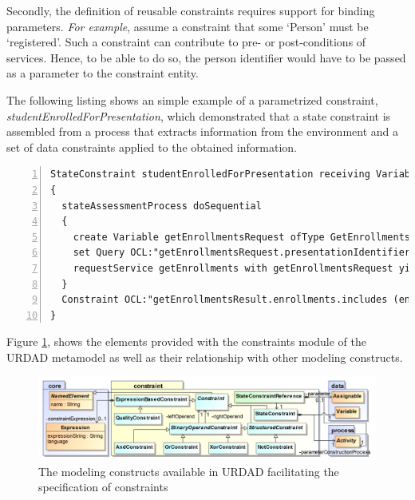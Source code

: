 Secondly, the definition of reusable constraints requires support for binding parameters. \emph{For example}, assume a constraint that some `Person' must be `registered'. Such a constraint can contribute to pre- or post-conditions of services. Hence, to be able to do so, the person identifier would have to be passed as a parameter to the constraint entity. 

The following listing shows an simple example of a parametrized constraint, \emph{studentEnrolledForPresentation}, which demonstrated that a state constraint is assembled from a process that extracts information from the environment and a set of data constraints applied to the obtained information.
\lstset{language=urdad,caption=Specifying a state constraint in the URDAD text grammar.,label=constraintTextSyntax}
\begin{lstlisting}[numbers=left,escapechar=|]
StateConstraint studentEnrolledForPresentation receiving Variable enrollForPresentationRequest ofType EnrollForPresentationRequest
{
  stateAssessmentProcess doSequential
  {
    create Variable getEnrollmentsRequest ofType GetEnrollmentsRequest
    set Query OCL:"getEnrollmentsRequest.presentationIdentifier" equalTo Query OCL:"enrollForPresentationRequest.presentationIdentifier"
    requestService getEnrollments with getEnrollmentsRequest yielding Variable getEnrollmentsResult ofType GetEnrollmentsResult
  }
  Constraint OCL:"getEnrollmentsResult.enrollments.includes (enrollForPresentationRequest.personIdentifier)"
}
\end{lstlisting}

Figure \ref{fig:constraintModule}, shows the elements provided with the constraints module of the URDAD metamodel as well as their relationship with other modeling constructs.
\begin{figure}[Htbp]
  \centering
  \includegraphics{constraint}
  \caption{The modeling constructs available in URDAD facilitating the specification of constraints}
  \label{fig:constraintModule}
\end{figure}

